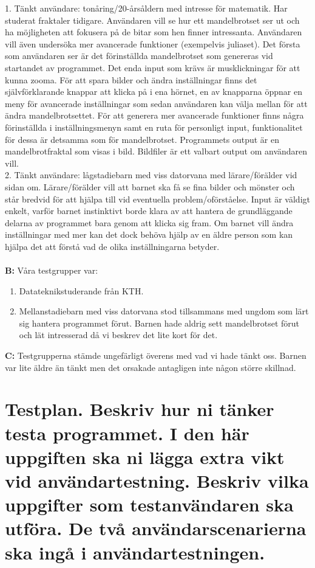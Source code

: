 \documentclass[11pt]{article} %
\begin{document}
1. Tänkt användare: tonåring/20-årsåldern med intresse för matematik. Har studerat fraktaler tidigare.
Användaren vill se hur ett mandelbrotset ser ut och ha möjligheten att fokusera på de bitar som hen finner intressanta. Användaren vill även undersöka mer avancerade funktioner (exempelvis juliaset).
Det första som användaren ser är det förinställda mandelbrotset som genereras vid startandet av programmet. Det enda input som krävs är musklickningar för att kunna zooma. För att spara bilder och ändra inställningar finns det självförklarande knappar att klicka på i ena hörnet, en av knapparna öppnar en meny för avancerade inställningar som sedan användaren kan välja mellan för att ändra mandelbrotsettet. För att generera mer avancerade funktioner finns några förinställda i inställningsmenyn samt en ruta för personligt input, funktionalitet för dessa är detsamma som för mandelbrotset.
Programmets output är en mandelbrotfraktal som visas i bild. Bildfiler är ett valbart output om användaren vill. \\

2. Tänkt användare: lågstadiebarn med viss datorvana med lärare/förälder vid sidan om.
Lärare/förälder vill att barnet ska få se fina bilder och mönster och står bredvid för att hjälpa till vid eventuella problem/oförståelse.
Input är väldigt enkelt, varför barnet instinktivt borde klara av att hantera de grundläggande delarna av programmet bara genom att klicka sig fram. Om barnet vill ändra inställningar med mer kan det dock behöva hjälp av en äldre person som kan hjälpa det att förstå vad de olika inställningarna betyder. 
\\
\\
{\bf B:}
Våra testgrupper var:
\begin{enumerate}
\item Datateknikstuderande från KTH.
\item Mellanstadiebarn med viss datorvana stod tillsammans med ungdom som lärt sig hantera programmet förut. 
Barnen hade aldrig sett mandelbrotset förut och lät intresserad då vi beskrev det lite kort för det.
\end{enumerate}
{\bf C:} Testgrupperna stämde ungefärligt överens med vad vi hade tänkt oss. Barnen var lite äldre än tänkt men det orsakade antagligen inte någon större skillnad.

\section{Testplan. Beskriv hur ni tänker testa programmet. I den här uppgiften ska ni lägga extra vikt vid användartestning. Beskriv vilka uppgifter som testanvändaren ska utföra. De två användarscenarierna ska ingå i användartestningen.}
\end{document}
